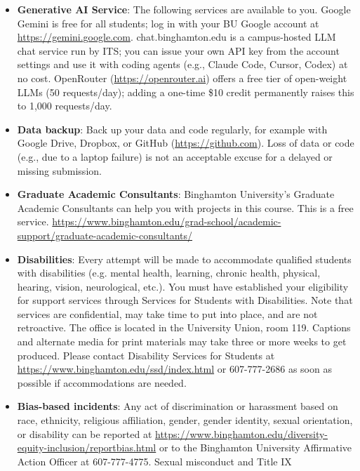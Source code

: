 \documentclass[11pt, a4paper]{article}
\begin{document}
\begin{itemize}
    \item \textbf{Generative AI Service}: The following services are available to you. Google Gemini is free for all students; log in with your BU Google account at \url{https://gemini.google.com}. chat.binghamton.edu is a campus-hosted LLM chat service run by ITS; you can issue your own API key from the account settings and use it with coding agents (e.g., Claude Code, Cursor, Codex) at no cost. OpenRouter (\url{https://openrouter.ai}) offers a free tier of open-weight LLMs (50 requests/day); adding a one-time \$10 credit permanently raises this to 1{,}000 requests/day.
    \item \textbf{Data backup}: Back up your data and code regularly, for example with Google Drive, Dropbox, or GitHub (\url{https://github.com}). Loss of data or code (e.g., due to a laptop failure) is not an acceptable excuse for a delayed or missing submission.
    \item \textbf{Graduate Academic Consultants}: Binghamton University's Graduate Academic Consultants can help you with projects in this course. This is a free service. \url{https://www.binghamton.edu/grad-school/academic-support/graduate-academic-consultants/}
    \item \textbf{Disabilities}: Every attempt will be made to accommodate qualified students with disabilities (e.g. mental health, learning, chronic health, physical, hearing, vision, neurological, etc.). You must have established your eligibility for support services through Services for Students with Disabilities. Note that services are confidential, may take time to put into place, and are not retroactive. The office is located in the University Union, room 119. Captions and alternate media for print materials may take three or more weeks to get produced. Please contact Disability Services for Students at \url{https://www.binghamton.edu/ssd/index.html} or 607-777-2686 as soon as possible if accommodations are needed.
    \item \textbf{Bias-based incidents}: Any act of discrimination or harassment based on race, ethnicity, religious affiliation, gender, gender identity, sexual orientation, or disability can be reported at \url{https://www.binghamton.edu/diversity-equity-inclusion/reportbias.html} or to the Binghamton University Affirmative Action Officer at 607-777-4775.
    Sexual misconduct and Title IX

\end{itemize}
\end{document}
